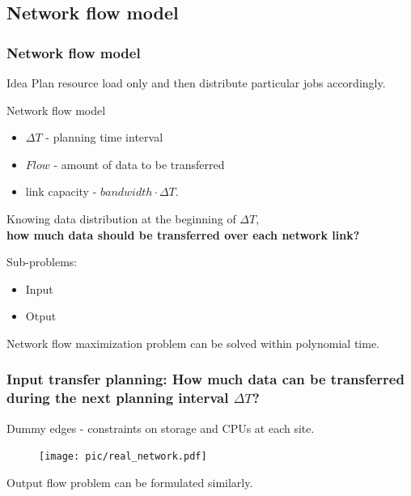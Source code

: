 \documentclass{beamer}
\begin{document}
\subsection{Network flow model}
\begin{frame}\frametitle{Network flow model} 
  \begin{block}{Idea}
    Plan resource load only and then distribute particular jobs accordingly.
  \end{block}

  \begin{block}{Network flow model}
    \begin{itemize}
      \item $\Delta T$ - planning time interval
      \item $Flow$ - amount of data to be transferred
      \item link capacity - $bandwidth \cdot \Delta T$.
    \end{itemize}
  \end{block}    
  Knowing data distribution at the beginning of $\Delta T$,\\
  \textbf{how much data should be transferred over each network link?}
  
    \begin{block}{Sub-problems:}
    \begin{itemize}
      \item Input
      \item Otput
    \end{itemize}
  \end{block}  
  
  Network flow maximization problem can be solved within polynomial time.
\end{frame}

\begin{frame}\frametitle{Input transfer planning: How much data can be transferred during the next planning interval $\Delta T$?}
Dummy edges - constraints on  storage and CPUs at each site.
\begin{figure}[h]
	\begin{center}
		\texttt{[image: pic/real\_network.pdf]}
	\end{center}
	\label{real_network}
\end{figure} 
\vspace{-3mm}
Output flow problem can be formulated similarly.
\end{frame}
\end{document}
